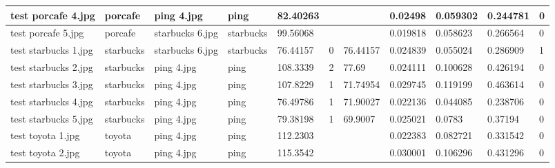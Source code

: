 \begin{landscape}
\begin{longtable}{|p{2cm}|p{1.5cm}|p{2cm}|p{1.5cm}|p{2cm}|p{1cm}|p{2cm}|p{2cm}|p{2cm}|p{2cm}|p{1cm}|}
		test porcafe 4.jpg   & porcafe          & ping 4.jpg            & ping                        & 82.40263              &                         &                            & 0.02498               & 0.059302              & 0.244781                 & 0                \\ \hline
		test porcafe 5.jpg   & porcafe          & starbucks 6.jpg       & starbucks                   & 99.56068              &                         &                            & 0.019818              & 0.058623              & 0.266564                 & 0                \\ \hline
		test starbucks 1.jpg & starbucks        & starbucks 6.jpg       & starbucks                   & 76.44157              & 0                       & 76.44157                   & 0.024839              & 0.055024              & 0.286909                 & 1                \\ \hline
		test starbucks 2.jpg & starbucks        & ping 4.jpg            & ping                        & 108.3339              & 2                       & 77.69                      & 0.024111              & 0.100628              & 0.426194                 & 0                \\ \hline
		test starbucks 3.jpg & starbucks        & ping 4.jpg            & ping                        & 107.8229              & 1                       & 71.74954                   & 0.029745              & 0.119199              & 0.463614                 & 0                \\ \hline
		test starbucks 4.jpg & starbucks        & ping 4.jpg            & ping                        & 76.49786              & 1                       & 71.90027                   & 0.022136              & 0.044085              & 0.238706                 & 0                \\ \hline
		test starbucks 5.jpg & starbucks        & ping 4.jpg            & ping                        & 79.38198              & 1                       & 69.9007                    & 0.025021              & 0.0783                & 0.37194                  & 0                \\ \hline
		test toyota 1.jpg    & toyota           & ping 4.jpg            & ping                        & 112.2303              &                         &                            & 0.022383              & 0.082721              & 0.331542                 & 0                \\ \hline
		test toyota 2.jpg    & toyota           & ping 4.jpg            & ping                        & 115.3542              &                         &                            & 0.030001              & 0.106296              & 0.431296                 & 0                \\ \hline

\end{longtable}
\end{landscape}
